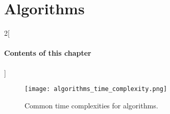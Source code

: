 \chapter{Algorithms}

\begin{multicols}{2}[\subsubsection*{Contents of this chapter}]
\end{multicols}


\begin{figure}
\centering
    \texttt{[image: algorithms\_time\_complexity.png]}
    \caption{Common time complexities for algorithms.}
    \label{fig:algorithms_time_complexity}
\end{figure}
